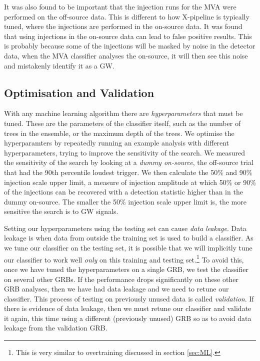 \documentclass[11pt]{cuthesis}
\newcommand{\xp}{X-pipeline }
\begin{document}
It was also found to be important that the injection runs for the MVA were performed on the off-source data. This is different to how \xp is typically tuned, where the injections are performed in the on-source data. It was found that using injections in the on-source data can lead to false positive results. This is probably because some of the injections will be masked by noise in the detector data, when the MVA classifier analyses the on-source, it will then see this noise and mistakenly identify it as a GW. 

\subsection{Optimisation and Validation} \label{sec:opt}
With any machine learning algorithm there are \textit{hyperparameters} that must be tuned. These are the parameters of the classifier itself, such as the number of trees in the ensemble, or the maximum depth of the trees. We optimise the hyperparamters by repeatedly running an example analysis with different hyperparameters, trying to improve the sensitivity of the search. We measured the sensitivity of the search by looking at a \textit{dummy on-source}, the off-source trial that had the 90th percentile loudest trigger. We then calculate the 50\% and 90\% injection scale upper limit, a measure of injection amplitude at which 50\% or 90\% of the injections can be recovered with a detection statistic higher than in the dummy on-source. The smaller the 50\% injection scale upper limit is, the more sensitive the search is to GW signals.

Setting our hyperparameters using the testing set can cause \textit{data leakage}. Data leakage is when data from outside the training set is used to build a classifier. As we tune our classifier on the testing set, it is possible that we will implicitly tune our classifier to work well \textit{only} on this training and testing set.\footnote{This is very similar to overtraining discussed in section \ref{sec:ML}.} To avoid this, once we have tuned the hyperparameters on a single GRB, we test the classifier on several other GRBs. If the performance drops significantly on these other GRB analyses, then we have had data leakage and we need to retune our classifier. This process of testing on previously unused data is called \textit{validation}. If there is evidence of data leakage, then we must retune our classifier and validate it again, this time using a different (previously unused) GRB so as to avoid data leakage from the validation GRB. 
\end{document}
